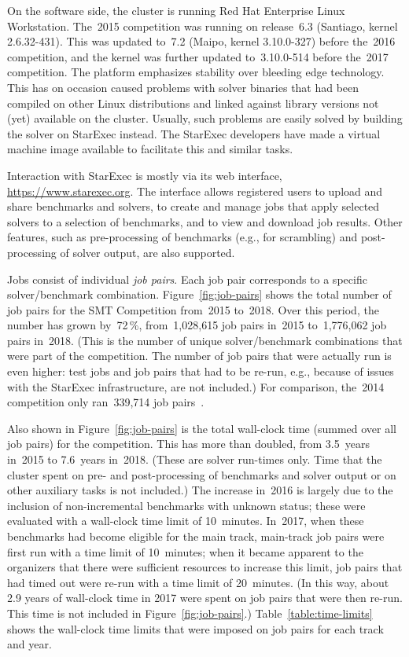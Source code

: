 \documentclass[twoside,11pt]{article}
\begin{document}
On the software side, the cluster is running Red Hat Enterprise Linux
Workstation.  The~2015 competition was running on release~6.3
(Santiago, kernel 2.6.32-431).  This was updated to~7.2 (Maipo, kernel
3.10.0-327) before the~2016 competition, and the kernel was further
updated to~3.10.0-514 before the~2017 competition.  The platform
emphasizes stability over bleeding edge technology.  This has on
occasion caused problems with solver binaries that had been compiled
on other Linux distributions and linked against library versions not
(yet) available on the cluster.  Usually, such problems are easily
solved by building the solver on StarExec instead.  The StarExec
developers have made a virtual machine image available to facilitate
this and similar tasks.

Interaction with StarExec is mostly via its web interface,
\url{https://www.starexec.org}.  The interface allows registered users
to upload and share benchmarks and solvers, to create and manage jobs
that apply selected solvers to a selection of benchmarks, and to view
and download job results.  Other features, such as pre-processing of
benchmarks (e.g., for scrambling) and post-processing of solver
output, are also supported.

Jobs consist of individual \emph{job pairs}.  Each job pair
corresponds to a specific solver/benchmark combination.
Figure~\ref{fig:job-pairs} shows the total number of job pairs for the
SMT Competition from~2015 to~2018.  Over this period, the number has
grown by~72\,\%, from~1,028,615 job pairs in~2015 to~1,776,062 job
pairs in~2018.  (This is the number of unique solver/benchmark
combinations that were part of the competition.  The number of job
pairs that were actually run is even higher: test jobs and job pairs
that had to be re-run, e.g., because of issues with the StarExec
infrastructure, are not included.)  For comparison, the~2014
competition only ran~339,714 job pairs~\cite{CDW14}.

Also shown in Figure~\ref{fig:job-pairs} is the total wall-clock time
(summed over all job pairs) for the competition.  This has more than
doubled, from 3.5~years in~2015 to 7.6~years in~2018.  (These are
solver run-times only.  Time that the cluster spent on pre- and
post-processing of benchmarks and solver output or on other auxiliary
tasks is not included.)  The increase in~2016 is largely due to the
inclusion of non-incremental benchmarks with unknown status; these
were evaluated with a wall-clock time limit of 10~minutes.  In~2017,
when these benchmarks had become eligible for the main track,
main-track job pairs were first run with a time limit of 10~minutes;
when it became apparent to the organizers that there were sufficient
resources to increase this limit, job pairs that had timed out were
re-run with a time limit of 20~minutes.  (In this way, about 2.9 years
of wall-clock time in 2017 were spent on job pairs that were then
re-run.  This time is not included in Figure~\ref{fig:job-pairs}.)
Table~\ref{table:time-limits} shows the wall-clock time limits that
were imposed on job pairs for each track and year.
\end{document}
